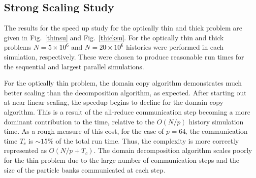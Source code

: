\documentclass[12pt]{article}
\begin{document}
{{{\subsection{Strong Scaling Study}

The results for the speed up study for the optically thin and thick problem are given
in Fig.~\ref{thinsu} and Fig.~\ref{thicksu}. For the optically thin and thick
problems $N=5\times10^6$ and $N=20\times10^6$ histories were performed in each
simulation, respectively.  These were chosen to produce reasonable run times for the
sequential and largest parallel simulations. 

For the optically thin problem, the domain copy algorithm demonstrates much better
scaling than the decomposition algorithm, as expected.  After starting out at near linear scaling, the speedup begins
to decline for the domain copy algorithm. This is a result of the all-reduce
communication step becoming a more dominant contribution to the time, relative to
the $O(N/p)$ history simulation time. As a rough measure of this cost, for the case
of $p=64$, the communication time $T_c$ is $\sim 15\%$ of the total run time.  Thus,
the complexity is more correctly represented as $O(N/p + T_c)$.  The domain decomposition algorithm scales poorly for the thin problem due to the large number
of communication steps and the size of the particle banks communicated at each step.

}}}
\end{document}
